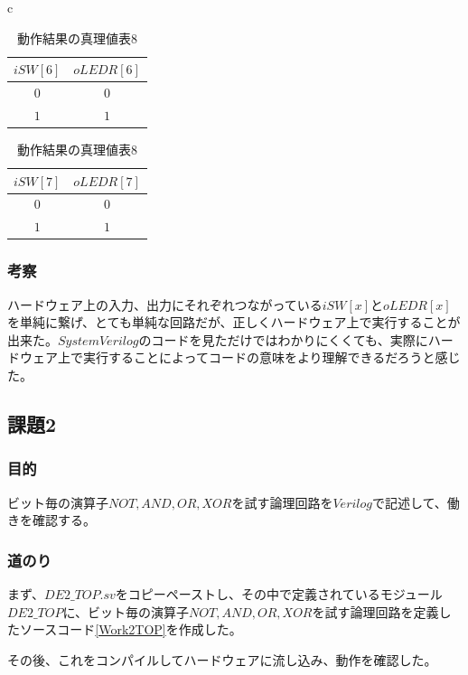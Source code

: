 \documentclass[a4paper]{jarticle}
\begin{document}
\begin{table}[!h]
	\begin{center}
		\begin{tabular}{c}
			\begin{minipage}{0.5\hsize}
				\begin{center}
					\caption{動作結果の真理値表7}
					\label{Work1TruthTable7}
					\begin{tabular}{|c|c|}
						\hline
						$iSW[6]$	&$oLEDR[6]$\\	\hline\hline
						$0$		&$0$\\		\hline
						$1$		&$1$\\		\hline
					\end{tabular}
				\end{center}
			\end{minipage}
			\begin{minipage}{0.5\hsize}
				\begin{center}
					\caption{動作結果の真理値表8}
					\label{Work2TruthTable8}
					\begin{tabular}{|c|c|}
						\hline
						$iSW[7]$	&$oLEDR[7]$\\	\hline\hline
						$0$		&$0$\\		\hline
						$1$		&$1$\\		\hline
					\end{tabular}
				\end{center}
			\end{minipage}
		\end{tabular}
	\end{center}
\end{table}
\subsubsection{考察}
ハードウェア上の入力、出力にそれぞれつながっている$iSW[x]$と$oLEDR[x]$を単純に繋げ、とても単純な回路だが、正しくハードウェア上で実行することが出来た。$System Verilog$のコードを見ただけではわかりにくくても、実際にハードウェア上で実行することによってコードの意味をより理解できるだろうと感じた。
\subsection{課題2}
\subsubsection{目的}
ビット毎の演算子$NOT,AND,OR,XOR$を試す論理回路を$Verilog$で記述して、働きを確認する。
\subsubsection{道のり}
まず、$DE2\_TOP.sv$をコピーペーストし、その中で定義されているモジュール$DE2\_TOP$に、ビット毎の演算子$NOT,AND,OR,XOR$を試す論理回路を定義したソースコード\ref{Work2TOP}を作成した。

その後、これをコンパイルしてハードウェアに流し込み、動作を確認した。
\end{document}
